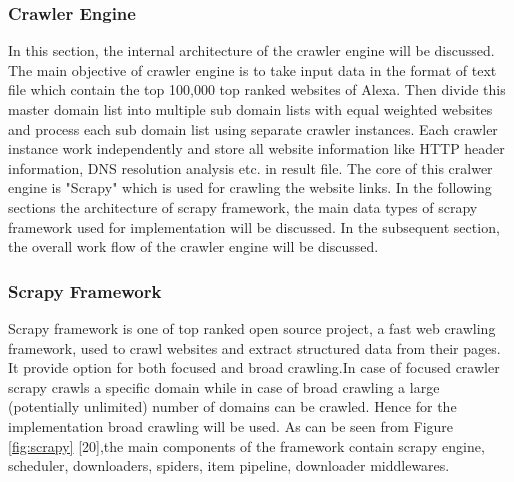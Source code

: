 \subsubsection{Crawler Engine}
\noindent In this section, the internal architecture of the crawler engine will be discussed. The main objective of crawler engine is to take input data in the format of text file which contain the top 100,000 top ranked websites of Alexa. Then divide this master domain list into multiple sub domain lists with equal weighted websites and process each sub domain list using separate crawler instances. Each crawler instance work independently and store all website information like HTTP header information, DNS resolution analysis etc. in result file. The core of this cralwer engine is "Scrapy" which is used for crawling the website links. In the following sections the architecture of scrapy framework, the main data types of scrapy framework used for implementation will be discussed. In the subsequent section, the overall work flow of the crawler engine will be discussed.\\
\subsubsection{Scrapy Framework}
\noindent Scrapy framework is one of top ranked open source project, a fast web crawling framework, used to crawl websites and extract structured data from their pages. It provide option for both focused and broad crawling.In case of focused crawler scrapy crawls a specific domain while in case of broad crawling a large (potentially unlimited) number of domains can be crawled. Hence for the implementation broad crawling will be used. As can be seen from Figure \ref{fig:scrapy} [20],the main components of the framework contain scrapy engine, scheduler, downloaders, spiders, item pipeline, downloader middlewares.\\

